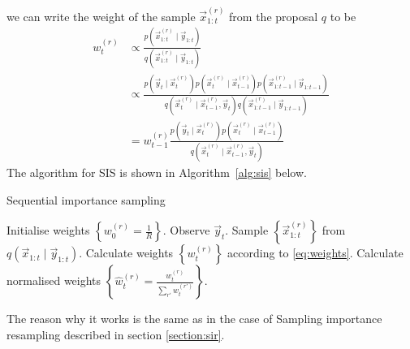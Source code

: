     we can write the weight of the sample $\vec x_{1:t}^{(r)}$ from the proposal $q$ to be
    \begin{align}
        w_t^{(r)}   &\propto \frac{p\left(\vec x_{1:t}^{(r)} \mid \vec y_{1:t}\right)}{q\left(\vec x_{1:t}^{(r)} \mid \vec y_{1:t}\right)} \\
                    &\propto \frac{p\left(\vec y_t \mid \vec x_t^{(r)}\right) p\left(\vec x_t^{(r)} \mid \vec x_{t - 1}^{(r)}\right) p\left(\vec x_{1:t - 1}^{(r)} \mid \vec y_{1:t - 1}\right)}{q\left(\vec x_t^{(r)} \mid \vec x_{t-1}^{(r)}, \vec y_t\right) q\left(\vec x_{1:t-1}^{(r)} \mid \vec y_{1:t - 1}\right)} \\
                    &= w_{t - 1}^{(r)} \frac{p\left(\vec y_t \mid \vec x_t^{(r)}\right) p\left(\vec x_t^{(r)} \mid \vec x_{t - 1}^{(r)}\right)}{q\left(\vec x_t^{(r)} \mid \vec x_{t - 1}^{(r)}, \vec y_t\right)} \label{eq:weights}
    \end{align}
    The algorithm for SIS is shown in Algorithm~\ref{alg:sis} below.
    \begin{algorithm}
    \caption{Sequential importance sampling}\label{alg:sis}
        \begin{algorithmic}[1]
            \State Initialise weights $\left\{w_0^{(r)} = \frac{1}{R}\right\}$.
                \State Observe $\vec y_t$.
                \State Sample $\left\{\vec x_{1:t}^{(r)}\right\}$ from $q\left(\vec x_{1:t} \mid \vec y_{1:t}\right)$.
                \State Calculate weights $\left\{w_t^{(r)}\right\}$ according to \eqref{eq:weights}.
                \State Calculate normalised weights $\left\{\hat w_t^{(r)} = \frac{w_t^{(r)}}{\sum_{r'} w_t^{(r')}}\right\}$.
                \State {}
            \EndFor
        \end{algorithmic}
    \end{algorithm}
    The reason why it works is the same as in the case of Sampling importance resampling described in section \ref{section:sir}.

